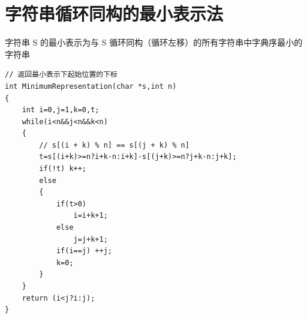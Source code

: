 \section{字符串循环同构的最小表示法}
\par \noindent 字符串 S 的最小表示为与 S 循环同构（循环左移）的所有字符串中字典序最小的字符串
\begin{verbatim}
// 返回最小表示下起始位置的下标
int MinimumRepresentation(char *s,int n)
{
    int i=0,j=1,k=0,t;
    while(i<n&&j<n&&k<n)
    {
        // s[(i + k) % n] == s[(j + k) % n]
        t=s[(i+k)>=n?i+k-n:i+k]-s[(j+k)>=n?j+k-n:j+k];
        if(!t) k++;
        else
        {
            if(t>0)
                i=i+k+1;
            else
                j=j+k+1;
            if(i==j) ++j;
            k=0;
        }
    }
    return (i<j?i:j);
}
\end{verbatim}